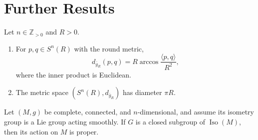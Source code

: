 \section{Further Results}

\begin{proposition}
\label{prop:round-metric-distance-sphere}

Let $n\in\mathbb Z_{>0}$ and $R>0$.
\begin{enumerate}
\item[(a)] For $p,q\in S^n(R)$ with the round metric,
\[
d_{\bar g_R}(p,q)=R\arccos\frac{\langle p,q\rangle}{R^2},
\]
where the inner product is Euclidean.
\item[(b)] The metric space $(S^n(R),d_{\bar g_R})$ has diameter $\pi R$.
\end{enumerate}
\end{proposition}

\begin{proposition}
\label{prop:isometry-group-acts-properly}

Let $(M,g)$ be complete, connected, and $n$-dimensional, and assume its
isometry group is a Lie group acting smoothly.  If $G$ is a closed subgroup of
$\operatorname{Iso}(M)$, then its action on $M$ is proper.
\end{proposition}
